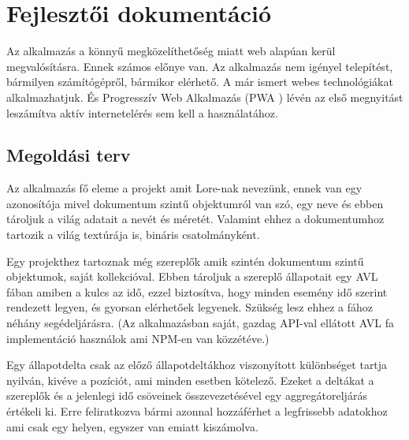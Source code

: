 \chapter{Fejlesztői dokumentáció}
\label{ch:impl}

Az alkalmazás a könnyű megközelíthetőség miatt web alapúan kerül megvalósításra. Ennek számos előnye van. Az alkalmazás nem igényel telepítést, bármilyen számítógépről, bármikor elérhető. A már ismert webes technológiákat alkalmazhatjuk. És Progresszív Web Alkalmazás (PWA \cite{PWA}) lévén az első megnyitást leszámítva aktív internetelérés sem kell a használatához.

\section{Megoldási terv}

Az alkalmazás fő eleme a projekt amit Lore-nak nevezünk, ennek van egy azonosítója mivel dokumentum szintű objektumról van szó, egy neve és ebben tároljuk a világ adatait a nevét és méretét. Valamint ehhez a dokumentumhoz tartozik a világ textúrája is, bináris csatolmányként.

Egy projekthez tartoznak még szereplők amik szintén dokumentum szintű objektumok, saját kollekcióval. Ebben tároljuk a szereplő állapotait egy AVL fában \cite{AVL} amiben a kulcs az idő, ezzel biztosítva, hogy minden esemény idő szerint rendezett legyen, és gyorsan elérhetőek legyenek. Szükség lesz ehhez a fához néhány segédeljárásra. (Az alkalmazásban saját, gazdag API-val ellátott AVL fa implementáció használok ami NPM-en van közzétéve.)

Egy állapotdelta csak az előző állapotdeltákhoz viszonyított különbséget tartja nyilván, kivéve a pozíciót, ami minden esetben kötelező. Ezeket a deltákat a szereplők és a jelenlegi idő csöveinek összevezetésével egy aggregátoreljárás értékeli ki. Erre feliratkozva bármi azonnal hozzáférhet a legfrissebb adatokhoz ami csak egy helyen, egyszer van emiatt kiszámolva.

